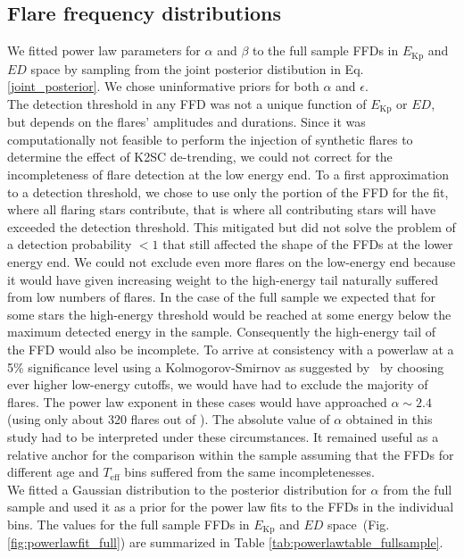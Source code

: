\documentclass{aa}
\begin{document}
\subsection{Flare frequency distributions}
We fitted power law parameters for $\alpha$ and $\beta$ to the full sample FFDs in $E_\mathrm{Kp}$ and $ED$ space by sampling from the joint posterior distibution in Eq. \ref{joint_posterior}. We chose uninformative priors for both $\alpha$ and $\epsilon$. 
\\
The detection threshold in any FFD was not a unique function of $E_\mathrm{Kp}$ or $ED$, but depends on the flares' amplitudes and durations. Since it was computationally not feasible to perform the injection of synthetic flares to determine the effect of K2SC de-trending, we could not correct for the incompleteness of flare detection at the low energy end. To a first approximation to a detection threshold, we chose to use only the portion of the FFD for the fit, where all flaring stars contribute, that is where all contributing stars will have exceeded the detection threshold. This mitigated but did not solve the problem of a detection probability $<1$ that still affected the shape of the FFDs at the lower energy end. We could not exclude even more flares on the low-energy end because it would have given increasing weight to the high-energy tail naturally suffered from low numbers of flares. In the case of the full sample we expected that for some stars the high-energy threshold would be reached at some energy below the maximum detected energy in the sample. Consequently the high-energy tail of the FFD would also be incomplete. To arrive at consistency with a powerlaw at a 5\% significance level using a Kolmogorov-Smirnov as suggested by~\citet{wheatland_flaresbayes_2004} by choosing ever higher low-energy cutoffs, we would have had to exclude the majority of flares. The power law exponent in these cases would have approached $\alpha\sim 2.4$ (using only about 320 flares out of ). The absolute value of $\alpha$ obtained in this study had to be interpreted under these circumstances. It remained useful as a relative anchor for the comparison within the sample assuming that the FFDs for different age and $T_\mathrm{eff}$ bins suffered from the same incompletenesses.
\\
We fitted a Gaussian distribution to the posterior distribution for $\alpha$ from the full sample and used it as a prior for the power law fits to the FFDs in the individual bins. The values for the full sample FFDs in $E_\mathrm{Kp}$ and $ED$ space~(Fig. \ref{fig:powerlawfit_full}) are summarized in Table \ref{tab:powerlawtable_fullsample}. 
\end{document}
